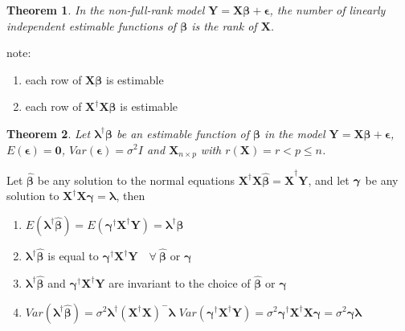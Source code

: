 \documentclass{article}
\newtheorem{theorem}{Theorem}
\begin{document}
\bigskip

\begin{theorem}
In the non-full-rank model $\mathbf{Y=X\beta +\epsilon }$, the number of
linearly independent estimable functions of $\mathbf{\beta }$ is the rank of 
$\mathbf{X}$.
\end{theorem}

\bigskip

note:

\begin{enumerate}
\item each row of $\mathbf{X\beta }$ is estimable

\item each row of $\mathbf{X}^{\dagger }\mathbf{X\beta }$ is estimable
\end{enumerate}

\bigskip

\begin{theorem}
Let $\mathbf{\lambda }^{\dagger }\mathbf{\beta }$ be an estimable function
of $\mathbf{\beta }$ in the model $\mathbf{Y=X\beta +\epsilon }$, $E\left( 
\mathbf{\epsilon }\right) =\mathbf{0}$, $Var\left( \mathbf{\epsilon }\right)
=\sigma ^{2}I$ and $\mathbf{X}_{n\times p}$ with $r\left( \mathbf{X}\right)
=r<p\leq n$.
\end{theorem}

\bigskip

Let $\mathbf{\hat{\beta}}$ be any solution to the normal equations $\mathbf{X%
}^{\dagger }\mathbf{X\hat{\beta}=X}^{\dagger }\mathbf{Y}$, and let $\mathbf{%
\gamma }$ be any solution to $\mathbf{X}^{\dagger }\mathbf{X\gamma =\lambda }
$, then

\begin{enumerate}
\item $E\left( \mathbf{\lambda }^{\dagger }\mathbf{\hat{\beta}}\right)
=E\left( \mathbf{\gamma }^{\dagger }\mathbf{X}^{\dagger }\mathbf{Y}\right) =%
\mathbf{\lambda }^{\dagger }\mathbf{\beta }$

\item $\mathbf{\lambda }^{\dagger }\mathbf{\hat{\beta}}$ is equal to $%
\mathbf{\gamma }^{\dagger }\mathbf{X}^{\dagger }\mathbf{Y\quad \forall \ 
\hat{\beta}}$ or $\mathbf{\gamma }$

\item $\mathbf{\lambda }^{\dagger }\mathbf{\hat{\beta}}$ and $\mathbf{\gamma 
}^{\dagger }\mathbf{X}^{\dagger }\mathbf{Y}$ are invariant to the choice of $%
\mathbf{\hat{\beta}}$ or $\mathbf{\gamma }$

\item $Var\left( \mathbf{\lambda }^{\dagger }\mathbf{\hat{\beta}}\right)
=\sigma ^{2}\mathbf{\lambda }^{\dagger }\left( \mathbf{X}^{\dagger }\mathbf{X%
}\right) ^{-}\mathbf{\lambda }$\newline
$Var\left( \mathbf{\gamma }^{\dagger }\mathbf{X}^{\dagger }\mathbf{Y}\right)
=\sigma ^{2}\mathbf{\gamma }^{\dagger }\mathbf{X}^{\dagger }\mathbf{X\gamma =%
}\sigma ^{2}\mathbf{\gamma \lambda }$
\end{enumerate}
\end{document}
